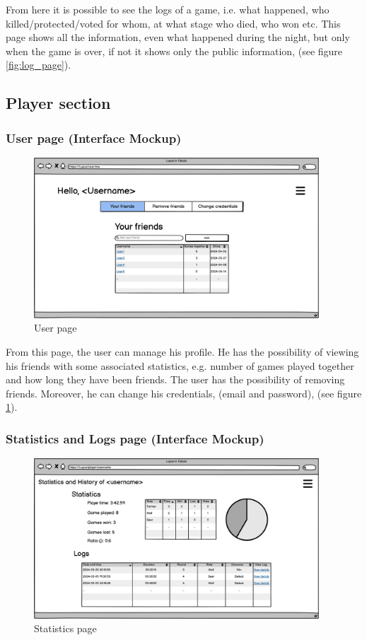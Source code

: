 From here it is possible to see the logs of a game, i.e. what happened, who killed/protected/voted for whom, at what stage who died, who won etc.
This page shows all the information, even what happened during the night, but only when the game is over, if not it shows only the public information, (see figure \ref{fig:log_page}).

\subsection{Player section}

\subsubsection{User page (Interface Mockup)}
\begin{figure}[htb] 
    \centering
    \includegraphics[height=6cm]{images/Page/User.png}
    \caption{User page}
    \label{fig:user_page}
\end{figure}

From this page, the user can manage his profile. He has the possibility of viewing his friends with some associated statistics, e.g. number of games played together and how long they have been friends. 
The user has the possibility of removing friends. Moreover, he can change his credentials, (email and password), (see figure \ref{fig:user_page}).

\subsubsection{Statistics and Logs page (Interface Mockup)}
\begin{figure}[htb] 
    \centering
    \includegraphics[height=6cm]{images/Page/Statistics.png}
    \caption{Statistics page}
    \label{fig:statistics_page}
\end{figure}

